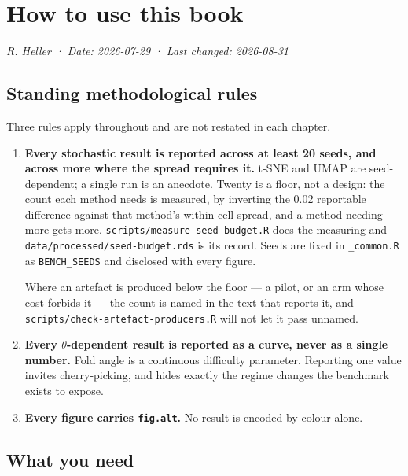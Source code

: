 \documentclass[
  british,
  a4paper,
]{book}
\begin{document}
\chapter*{How to use this book}\label{how-to-use-this-book}

\emph{R. Heller · Date: 2026-07-29 · Last changed: 2026-08-31}

\section*{Standing methodological rules}\label{standing-methodological-rules}

Three rules apply throughout and are not restated in each chapter.

\begin{enumerate}
\def\labelenumi{\arabic{enumi}.}
\item
  \textbf{Every stochastic result is reported across at least 20 seeds, and across
  more where the spread requires it.} t-SNE and UMAP are seed-dependent; a
  single run is an anecdote. Twenty is a floor, not a design: the count each
  method needs is measured, by inverting the 0.02 reportable difference against
  that method's within-cell spread, and a method needing more gets more.
  \texttt{scripts/measure-seed-budget.R} does the measuring and
  \texttt{data/processed/seed-budget.rds} is its record. Seeds are fixed in
  \texttt{\_common.R} as \texttt{BENCH\_SEEDS} and disclosed with every figure.

  Where an artefact is produced below the floor --- a pilot, or an arm whose cost
  forbids it --- the count is named in the text that reports it, and
  \texttt{scripts/check-artefact-producers.R} will not let it pass unnamed.
\item
  \textbf{Every \(\theta\)-dependent result is reported as a curve, never as a single
  number.} Fold angle is a continuous difficulty parameter. Reporting one
  value invites cherry-picking, and hides exactly the regime changes the
  benchmark exists to expose.
\item
  \textbf{Every figure carries \texttt{fig.alt}.} No result is encoded by colour alone.
\end{enumerate}

\section*{What you need}\label{what-you-need}
\end{document}
